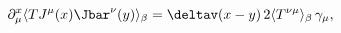 \begin{equation}
\label{eq:wtdrei}
\partial^x_\mu\langle T J^\mu(x)\Jbar^\nu(y) \rangle_\beta
  =\deltav(x-y)\, 2\langle T^{\nu\mu}\rangle_\beta\,\gamma_\mu,
\end{equation}

